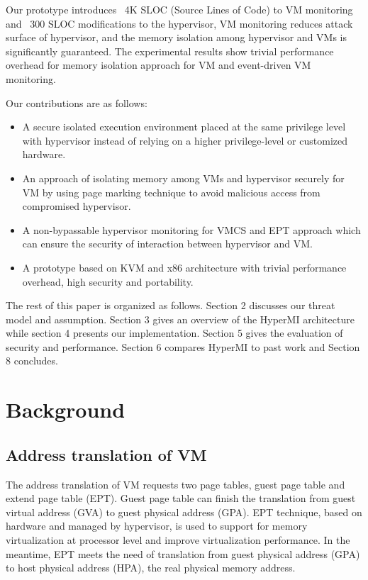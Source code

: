 \documentclass[conference]{IEEEtran}
\begin{document}
Our prototype introduces ~4K SLOC (Source Lines of Code) to VM monitoring and ~300 SLOC modifications to the hypervisor, VM monitoring reduces attack surface of hypervisor, and the memory isolation among hypervisor and VMs is significantly guaranteed. The experimental results show trivial performance overhead for memory isolation approach for VM and event-driven VM monitoring.


Our contributions are as follows:
\begin{itemize}
\item A secure isolated execution environment placed at the same privilege level with hypervisor instead of relying on a higher privilege-level or customized hardware.
\item{An approach of isolating memory among VMs and hypervisor securely for VM by using page marking technique to avoid malicious access from compromised hypervisor.}

\item{A non-bypassable hypervisor monitoring for VMCS and EPT approach  which can ensure the security of interaction between hypervisor and VM.}

\item{A prototype based on KVM and x86 architecture with trivial performance overhead, high security and portability.}

\end{itemize}

The rest of this paper is organized as follows. Section 2 discusses our threat model and assumption. Section 3 gives an overview of the HyperMI architecture while section 4 presents our implementation. Section 5 gives the evaluation of security and performance. Section 6 compares HyperMI to past work and Section 8 concludes.



\iffalse
\section{Background}
\subsection{Address translation of VM}
The address translation of VM requests two page tables, guest page table and extend page table (EPT). Guest page table can finish the translation from guest virtual address (GVA) to guest physical address (GPA). EPT technique, based on hardware and managed by hypervisor, is used to support for memory virtualization at processor level and improve virtualization performance. In the meantime, EPT meets the need of translation from guest physical address (GPA) to host physical address (HPA), the real physical memory address. 
\end{document}
